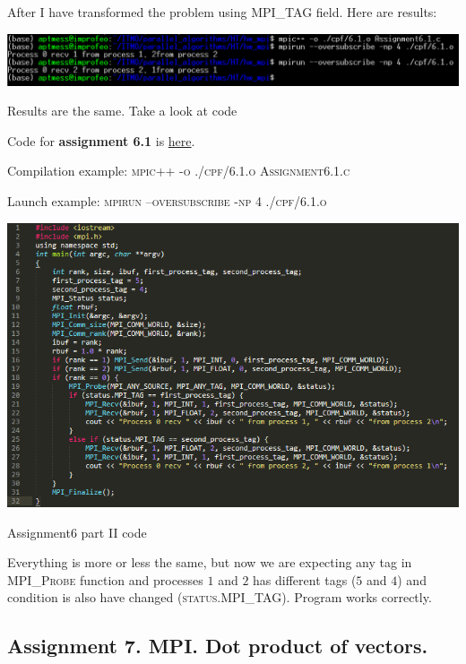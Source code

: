 \documentclass[%
12pt, %
final, %
oneside, %
onecolumn, %
centertags]{article} %
\theoremstyle{plain}
\theoremstyle{definition}
\theoremstyle{remark}
\begin{document}
After I have transformed the problem using \textsc{MPI\_TAG} field. Here are results:

\begin{center}
\includegraphics[scale=0.65]{6.2.png}

Results are the same. Take a look at code
\end{center}

Code for \textbf{assignment 6.1} is \href{https:\//github.com/aptmess/parallel_algorithms/blob/master/HT/hw_mpi/Assignment6.1.c}{here}.

Compilation example: \textsc{mpic++ -o ./cpf/6.1.o Assignment6.1.c}

Launch example: \textsc{mpirun --oversubscribe -np 4 ./cpf/6.1.o}

\begin{center}
\includegraphics[scale=0.7]{6.2.code.png}

Assignment6 part II code
\end{center}

Everything is more or less the same, but now we are expecting any tag in \textsc{MPI\_Probe} function and processes $1$ and $2$ has different tags ($5$ and $4$) and condition is also have changed (\textsc{status.MPI\_TAG}). Program works correctly.


\newpage
\subsection{Assignment 7. MPI. Dot product of vectors.} 
\end{document}
